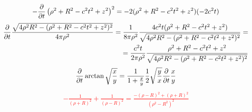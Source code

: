 %
\textcolor{red}{ \begin{equation*} \begin{aligned}
- \frac{\partial }{\partial t} \left( \rho^2 + R^2 - c^2t^2 + z^2 \right)^2 = 
- 2 (\rho^2 + R^2 -c^2t^2 + z^2) (-2 c^2 t)
\end{aligned} \end{equation*} }
%
\textcolor{lightgray}{ \begin{equation*} \begin{aligned}
\frac{\partial }{\partial t} \frac{\sqrt{4 \rho^2 R^2 - (\rho^2 + R^2 - c^2t^2 + z^2)^2}}
{4 \pi \rho^2} = \frac{1}{8 \pi \rho^2} 
\frac{ 4 c^2 t (\rho^2 + R^2 - c^2 t^2 + z^2) }
{ \sqrt{4 \rho^2 R^2 - (\rho^2 + R^2 - c^2t^2 + z^2)^2} } = \\
= \frac{c^2 t}{2 \pi \rho^2} \frac{\rho^2 + R^2 - c^2 t^2 + z^2}
{ \sqrt{4 \rho^2 R^2 - (\rho^2 + R^2 - c^2t^2 + z^2)^2} }
\end{aligned} \end{equation*} }
%
\textcolor{red}{ \begin{equation*} \begin{aligned}
\frac{\partial }{\partial t} \arctan \sqrt{ \frac{x}{y} } = 
\frac{1}{1 + \frac{x}{y}} \frac{1}{2} 
\sqrt \frac{y}{x} \frac{\partial }{\partial t} \frac{x}{y}
\end{aligned} \end{equation*} }
%
\textcolor{red}{ \begin{equation*} \begin{aligned}
- \frac{1}{(\rho + R)^2} + \frac{1}{(\rho - R)^2} = 
\frac{- (\rho-R)^2 + (\rho+R)^2 }{ (\rho^2 - R^2)^2 }
\end{aligned} \end{equation*} }
%
